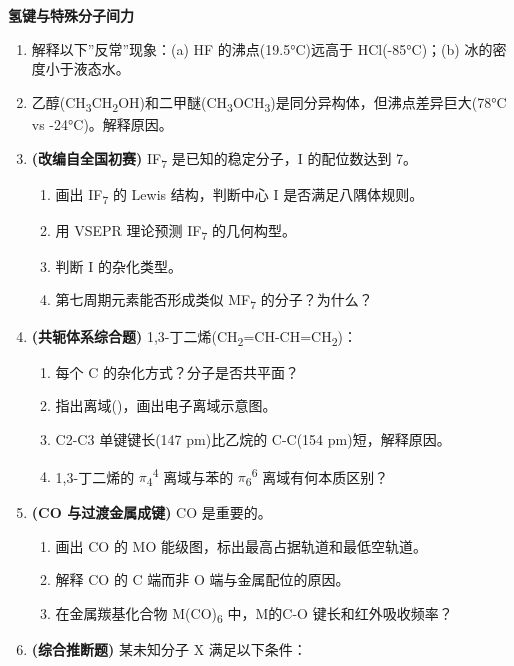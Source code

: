 \documentclass[a4paper,11pt]{ctexart}
\providecommand{\tightlist}{\setlength{\itemsep}{0pt}\setlength{\parskip}{0pt}}
\newcommand{\箭}{\ensuremath{\rightarrow}}
\newcommand{\左箭}{\ensuremath{\leftarrow}}
\newcommand{\上箭}{\ensuremath{\uparrow}}
\newcommand{\下箭}{\ensuremath{\downarrow}}
\newcommand{\衡}{\ensuremath{\rightleftharpoons}}
\newcommand{\双箭}{\ensuremath{\leftrightarrow}}
\newcommand{\约等于}{\ensuremath{\approx}}
\newcommand{\小于等于}{\ensuremath{\leq}}
\newcommand{\大于等于}{\ensuremath{\geq}}
\newcommand{\不等于}{\ensuremath{\neq}}
\newcommand{\西格马}{\ensuremath{\sigma}}
\newcommand{\派}{\ensuremath{\pi}}
\begin{document}
\textbf{氢键与特殊分子间力}

\begin{enumerate}
\def\labelenumi{\arabic{enumi}.}
\setcounter{enumi}{20}
\item
  解释以下''反常''现象：(a) HF 的沸点(19.5°C)远高于 HCl(-85°C)；(b) 冰的密度小于液态水。
\item
  乙醇(CH\textsubscript{3}CH\textsubscript{2}OH)和二甲醚(CH\textsubscript{3}OCH\textsubscript{3})是同分异构体，但沸点差异巨大(78°C vs -24°C)。解释原因。
\item
  \textbf{(改编自全国初赛)} IF\textsubscript{7} 是已知的稳定分子，I 的配位数达到 7。

  \begin{enumerate}
  \def\labelenumii{(\alph{enumii})}
  \tightlist
  \item
    画出 IF\textsubscript{7} 的 Lewis 结构，判断中心 I 是否满足八隅体规则。
  \item
    用 VSEPR 理论预测 IF\textsubscript{7} 的几何构型。
  \item
    判断 I 的杂化类型。
  \item
    第七周期元素能否形成类似 MF\textsubscript{7} 的分子？为什么？
  \end{enumerate}
\item
  \textbf{(共轭体系综合题)} 1,3-丁二烯(CH\textsubscript{2}=CH-CH=CH\textsubscript{2})：

  \begin{enumerate}
  \def\labelenumii{(\alph{enumii})}
  \tightlist
  \item
    每个 C 的杂化方式？分子是否共平面？
  \item
    指出离域()，画出电子离域示意图。
  \item
    C2-C3 单键键长(147 pm)比乙烷的 C-C(154 pm)短，解释原因。
  \item
    1,3-丁二烯的 \派\textsubscript{4}\textsuperscript{4} 离域与苯的 \派\textsubscript{6}\textsuperscript{6} 离域有何本质区别？
  \end{enumerate}
\item
  \textbf{(CO 与过渡金属成键)} CO 是重要的。

  \begin{enumerate}
  \def\labelenumii{(\alph{enumii})}
  \tightlist
  \item
    画出 CO 的 MO 能级图，标出最高占据轨道和最低空轨道。
  \item
    解释 CO 的 C 端而非 O 端与金属配位的原因。
  \item
    在金属羰基化合物 M(CO)\textsubscript{6} 中，M 的 C-O 键长和红外吸收频率？
  \end{enumerate}
\item
  \textbf{(综合推断题)} 某未知分子 X 满足以下条件：


\end{enumerate}
\end{document}
